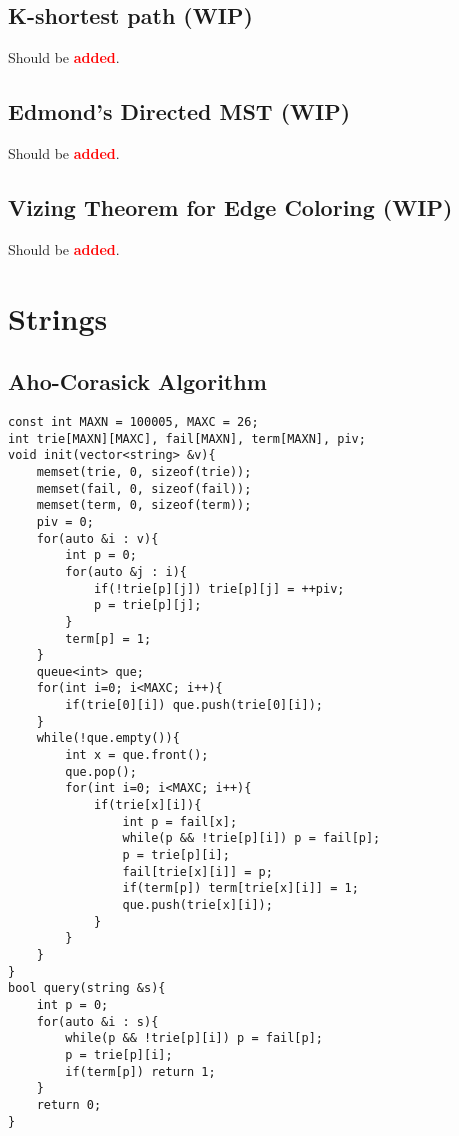 \documentclass[landscape, 10pt, a4paper, oneside,  twocolumn]{article}
\newcommand{\added}{Should be \textcolor{red}{\textbf{added}}.}
\begin{document}
\subsection{K-shortest path (WIP)}
\added

\subsection {Edmond's Directed MST (WIP)}
\added

\subsection {Vizing Theorem for Edge Coloring (WIP)}
\added

\section{Strings}

\subsection{Aho-Corasick Algorithm}
\begin{verbatim}
const int MAXN = 100005, MAXC = 26;
int trie[MAXN][MAXC], fail[MAXN], term[MAXN], piv;
void init(vector<string> &v){
	memset(trie, 0, sizeof(trie));
	memset(fail, 0, sizeof(fail));
	memset(term, 0, sizeof(term));
	piv = 0;
	for(auto &i : v){
		int p = 0;
		for(auto &j : i){
			if(!trie[p][j]) trie[p][j] = ++piv;
			p = trie[p][j];
		}
		term[p] = 1;
	}
	queue<int> que;
	for(int i=0; i<MAXC; i++){
		if(trie[0][i]) que.push(trie[0][i]);
	}
	while(!que.empty()){
		int x = que.front();
		que.pop();
		for(int i=0; i<MAXC; i++){
			if(trie[x][i]){
				int p = fail[x];
				while(p && !trie[p][i]) p = fail[p];
				p = trie[p][i];
				fail[trie[x][i]] = p;
				if(term[p]) term[trie[x][i]] = 1;
				que.push(trie[x][i]);
			}
		}
	}
}
bool query(string &s){
	int p = 0;
	for(auto &i : s){
		while(p && !trie[p][i]) p = fail[p];
		p = trie[p][i];
		if(term[p]) return 1;
	}
	return 0;
}
\end{verbatim}
\end{document}
